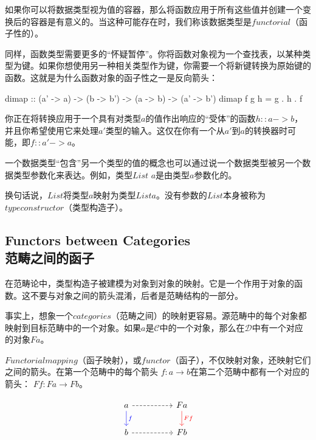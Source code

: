 \documentclass[DaoFP]{subfiles}
\begin{document}
    如果你可以将数据类型视为值的容器，那么将函数应用于所有这些值并创建一个变换后的容器是有意义的。当这种可能存在时，我们称该数据类型是$functorial$（函子性的）。

    同样，函数类型需要更多的“怀疑暂停”。你将函数对象视为一个查找表，以某种类型为键。如果你想使用另一种相关类型作为键，你需要一个将新键转换为原始键的函数。这就是为什么函数对象的函子性之一是反向箭头：

    \begin{haskell}
        dimap :: (a' -> a) -> (b -> b') -> (a -> b) -> (a' -> b')
        dimap f g h = g . h . f
    \end{haskell}

    你正在将转换应用于一个具有对类型$a$的值作出响应的“受体”的函数$h :: a -> b$，并且你希望使用它来处理$a'$类型的输入。这仅在你有一个从$a'$到$a$的转换器时可能，即$f :: a' -> a$。

    一个数据类型“包含”另一个类型的值的概念也可以通过说一个数据类型被另一个数据类型参数化来表达。例如，类型$List$ $a$是由类型$a$参数化的。

    换句话说，$List$将类型$a$映射为类型$List a$。没有参数的$List$本身被称为$type constructor$（类型构造子）。

    \subsection{Functors between Categories\\范畴之间的函子}

    在范畴论中，类型构造子被建模为对象到对象的映射。它是一个作用于对象的函数。这不要与对象之间的箭头混淆，后者是范畴结构的一部分。

    事实上，想象一个$categories$（范畴之间）的映射更容易。源范畴中的每个对象都映射到目标范畴中的一个对象。如果$a$是$\mathcal{C}$中的一个对象，那么在$\mathcal{D}$中有一个对应的对象$F a$。

    $Functorial mapping$（函子映射），或$functor$（函子），不仅映射对象，还映射它们之间的箭头。在第一个范畴中的每个箭头
    $f \colon a \to b$在第二个范畴中都有一个对应的箭头：
    $F f \colon F a \to F b$。

    \[
        \begin{tikzcd}
            a
            \arrow[d, blue, "f"]
            \arrow[rr, dashed]
            && F a
            \arrow[d, red, "F f"]
            \\
            b
            \arrow[rr, dashed]
            && F b
        \end{tikzcd}
    \]
\end{document}
